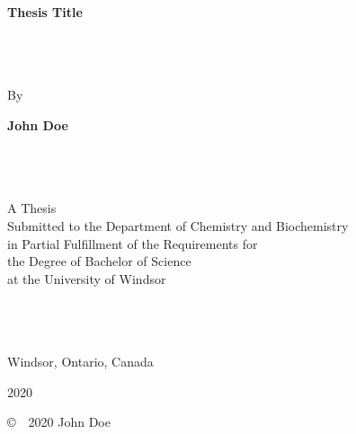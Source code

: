 \documentclass[11pt, oneside]{book} %
\title{\ttitle} %
\newcommand{\ttitle}{Thesis Title}
\newcommand{\authornames}{John Doe}
\begin{document}
\frontmatter %

\begin{titlepage}
\begin{center}

{\Huge \bfseries \ttitle} %

~\\~\\~\\

By

{\Large \bfseries \authornames} %

~\\~\\~\\

A Thesis\\
Submitted to the Department of Chemistry and Biochemistry\\
in Partial Fulfillment of the Requirements for\\
the Degree of Bachelor of Science\\
at the University of Windsor

~\\~\\~\\

Windsor, Ontario, Canada

2020 %

\vfill

\copyright \ \ 2020 \authornames

\end{center}
\end{titlepage}

\setcounter{page}{2}

\thispagestyle{empty} %
\end{document}
